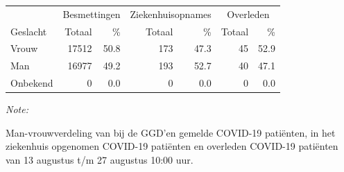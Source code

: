 \documentclass[
  english,
  man,floatsintext]{apa6}
\begin{document}
\begin{table}
\centering\begingroup\fontsize{11}{13}\selectfont

\begin{threeparttable}
\begin{tabular}{lrrrrrr}
\toprule
\multicolumn{1}{c}{ } & \multicolumn{2}{c}{Besmettingen} & \multicolumn{2}{c}{Ziekenhuisopnames} & \multicolumn{2}{c}{Overleden} \\
\cmidrule(l{3pt}r{3pt}){2-3} \cmidrule(l{3pt}r{3pt}){4-5} \cmidrule(l{3pt}r{3pt}){6-7}
Geslacht & Totaal & \% & Totaal & \% & Totaal & \%\\
\midrule
Vrouw & 17512 & 50.8 & 173 & 47.3 & 45 & 52.9\\
Man & 16977 & 49.2 & 193 & 52.7 & 40 & 47.1\\
Onbekend & 0 & 0.0 & 0 & 0.0 & 0 & 0.0\\
\bottomrule
\end{tabular}
\begin{tablenotes}
\item \textit{Note: } 
\item Man-vrouwverdeling van bij de GGD’en gemelde COVID-19 patiënten, in het ziekenhuis opgenomen COVID-19 patiënten en overleden COVID-19 patiënten van 13 augustus t/m 27 augustus 10:00 uur.
\end{tablenotes}
\end{threeparttable}
\endgroup{}
\end{table}
\newpage
\end{document}
